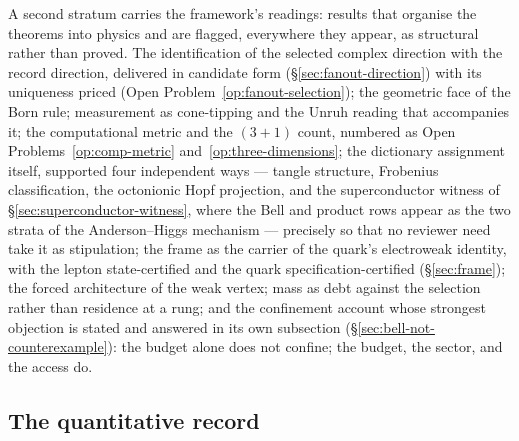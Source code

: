 A second stratum carries the framework's readings: results that organise the theorems into physics
and are flagged, everywhere they appear, as structural rather than proved. The identification of
the selected complex direction with the record direction, delivered in candidate form
(\S\ref{sec:fanout-direction}) with its uniqueness priced (Open Problem~\ref{op:fanout-selection});
the geometric face of the Born rule; measurement as cone-tipping and the Unruh reading that
accompanies it; the computational metric and the $(3+1)$ count, numbered as
Open Problems~\ref{op:comp-metric} and~\ref{op:three-dimensions}; the dictionary assignment itself,
supported four independent ways --- tangle structure, Frobenius classification, the octonionic
Hopf projection, and the superconductor witness of \S\ref{sec:superconductor-witness}, where
the Bell and product rows appear as the two strata of the Anderson--Higgs mechanism --- precisely so that no reviewer need take it as stipulation; the frame as the
carrier of the quark's electroweak identity, with the lepton state-certified and the quark
specification-certified (\S\ref{sec:frame}); the forced architecture of the weak vertex; mass as
debt against the selection rather than residence at a rung; and the confinement account whose
strongest objection is stated and answered in its own subsection
(\S\ref{sec:bell-not-counterexample}): the budget alone does not confine; the budget, the sector,
and the access do.

\subsection{The quantitative record}

